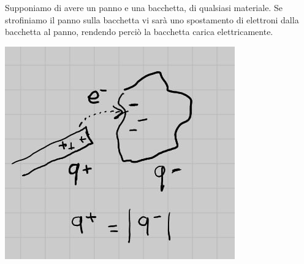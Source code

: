 \documentclass[a4peper, 12pt, twoside]{report}
\begin{document}
Supponiamo di avere un panno e una bacchetta, di qualsiasi materiale. Se strofiniamo il panno sulla bacchetta 
vi sar\`a uno spostamento di elettroni dalla bacchetta al panno, rendendo perci\`o la bacchetta carica elettricamente.

\begin{center}
    \includegraphics[scale=1]{strofinio}
\end{center}
\end{document}
